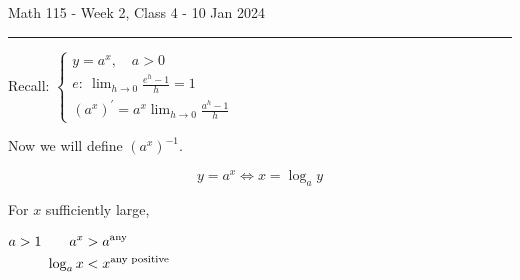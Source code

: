 \documentclass{article}
\begin{document}
Math 115 - Week 2, Class 4 - 10 Jan 2024
\hrule

\begin{center}
Recall:
$\left\{\begin{aligned}
y=a^x,\quad a>0\\
e:\ \lim_{h\to0}\frac{e^h-1}{h}=1\\
(a^x)^\prime=a^x\lim_{h\to0}\frac{a^h-1}{h}
\end{aligned}\right.$
\end{center}

Now we will define $(a^x)^{-1}$.

\[y=a^x\Longleftrightarrow x=\log_ay\]

For $x$ sufficiently large,

$\begin{aligned}
a>1\qquad a^x&>a^\textnormal{any}\\
\log_ax&<x^\textnormal{any positive}
\end{aligned}$

\vspace{10pt}
\end{document}
